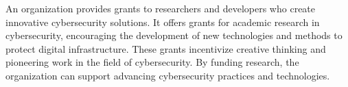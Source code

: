 An organization provides grants to researchers and developers who create innovative cybersecurity solutions. It offers grants for academic research in cybersecurity, encouraging the development of new technologies and methods to protect digital infrastructure. These grants incentivize creative thinking and pioneering work in the field of cybersecurity. By funding research, the organization can support advancing cybersecurity practices and technologies.